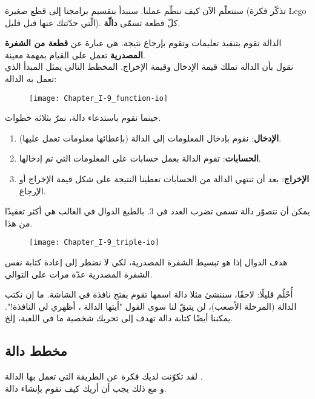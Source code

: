 سنتعلّم الآن كيف ننظّم عملنا. سنبدأ بتقسيم برامجنا إلى قطع صغيرة (تذكّر فكرة
\textenglish{Lego}
الّتي حدّثتك عنها قبل قليل). كلّ قطعة تسمّى
\textbf{دالّة}.

الدالة تقوم بتنفيذ تعليمات وتقوم بإرجاع نتيجة. هي عبارة عن 
\textbf{قطعة من الشفرة المصدرية} 
تعمل على القيام بمهمة معينة.\\
نقول بأن الدالة تملك قيمة الإدخال وقيمة الإخراج. المخطط التالي يمثل المبدأ الذي تعمل به الدالة:

\begin{figure}[H]
	\centering
	\texttt{[image: Chapter\_I-9\_function-io]}
\end{figure}

حينما نقوم باستدعاء دالة، نمرّ بثلاثة خطوات.

\begin{enumerate}
	\item \textbf{الإدخال}:
	 نقوم بإدخال المعلومات إلى الدالة (بإعطائها معلومات تعمل عليها).
	\item \textbf{الحسابات}:
	 تقوم الدالة بعمل حسابات على المعلومات التي تم إدخالها.
	\item \textbf{الإخراج}:
	 بعد أن تنتهي الدالة من الحسابات تعطينا النتيجة على شكل قيمة الإخراج أو الإرجاع.
\end{enumerate}

يمكن أن نتصوّر دالة تسمى
تضرب العدد في 3. بالطبع الدوال في الغالب هي أكثر تعقيدًا من هذا.

\begin{figure}[H]
	\centering
	\texttt{[image: Chapter\_I-9\_triple-io]}
\end{figure}

هدف الدوال إذا هو تبسيط الشفرة المصدرية، لكي لا نضطر إلى إعادة كتابة نفس الشفرة المصدرية عدّة مرات على التوالي.

أُحْلُم قليلًا: لاحقًا، سننشئ مثلا دالة اسمها
تقوم بفتح نافذة في الشاشة. ما إن نكتب الدالة (المرحلة الأصعب)، لن يتبقّ لنا سوى القول "أيتها الدالة
،
أظهري لي النافذة!". يمكننا أيضًا كتابة دالة
تهدف إلى تحريك شخصية ما في اللعبة، إلخ.

\subsection{مخطط دالة}

لقد تكوّنت لديك فكرة عن الطريقة التي تعمل بها الدالة 
.\\
و مع ذلك يجب أن أريك كيف نقوم بإنشاء دالة. 


